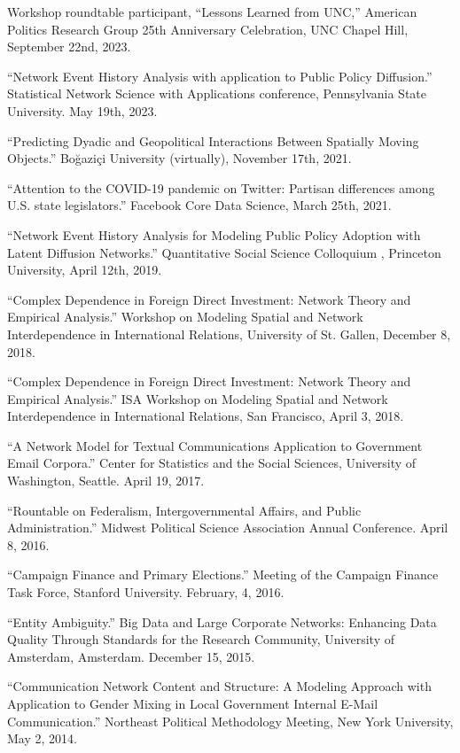 \documentclass[overlapped,line]{res}
\begin{document}
\begin{resume}
\begin{etaremune}
\item Workshop roundtable participant, ``Lessons Learned from UNC,'' American Politics Research Group 25th Anniversary Celebration, UNC Chapel Hill, September 22nd, 2023. 
\item ``Network Event History Analysis with application to Public Policy Diffusion.'' Statistical Network Science with Applications conference, Pennsylvania State University. May 19th, 2023.
\item ``Predicting Dyadic and Geopolitical Interactions Between Spatially Moving Objects.'' Boğaziçi University (virtually), November 17th, 2021.
\item ``Attention to the COVID-19 pandemic on Twitter: Partisan differences among U.S. state legislators.'' Facebook Core Data Science, March 25th, 2021.
\item ``Network Event History Analysis for Modeling Public Policy Adoption with Latent Diffusion Networks.''  Quantitative Social Science Colloquium , Princeton University, April 12th, 2019.
\item ``Complex Dependence in Foreign Direct Investment: Network Theory and Empirical Analysis.'' Workshop on Modeling Spatial and Network Interdependence in International Relations, University of St. Gallen, December 8, 2018.
\item ``Complex Dependence in Foreign Direct Investment: Network Theory and Empirical Analysis.'' ISA Workshop on Modeling Spatial and Network Interdependence in International Relations, San Francisco, April 3, 2018.
\item ``A Network Model for Textual Communications Application to Government Email Corpora.'' Center for Statistics and the Social Sciences, University of Washington, Seattle. April 19, 2017.
\item ``Rountable on Federalism, Intergovernmental Affairs, and Public Administration.'' Midwest Political Science Association Annual Conference. April 8, 2016. 
\item ``Campaign Finance and Primary Elections.'' Meeting of the Campaign Finance Task Force, Stanford University. February, 4, 2016.
\item ``Entity Ambiguity.'' Big Data and Large Corporate Networks: Enhancing Data Quality Through Standards for the Research Community, University of Amsterdam, Amsterdam. December 15, 2015. 
\item ``Communication Network Content and Structure: A Modeling Approach with Application to Gender Mixing in Local Government Internal E-Mail Communication.'' Northeast Political Methodology Meeting, New York University, May 2, 2014.

\end{etaremune}
\end{resume}
\end{document}
